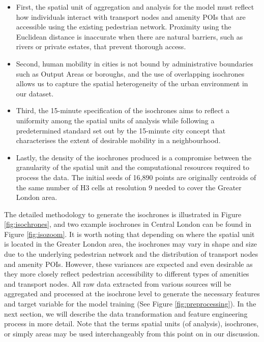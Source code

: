 \begin{itemize}
    \setlength\itemsep{0em}
    \item First, the spatial unit of aggregation and analysis for the model must reflect how individuals interact with transport nodes and amenity POIs that are accessible using the existing pedestrian network. Proximity using the Euclidean distance is inaccurate when there are natural barriers, such as rivers or private estates, that prevent thorough access. 
    \item Second, human mobility in cities is not bound by administrative boundaries such as Output Areas or boroughs, and the use of overlapping isochrones allows us to capture the spatial heterogeneity of the urban environment in our dataset.
    \item Third, the 15-minute specification of the isochrones aims to reflect a uniformity among the spatial units of analysis while following a predetermined standard set out by the 15-minute city concept that characterises the extent of desirable mobility in a neighbourhood.
    \item Lastly, the density of the isochrones produced is a compromise between the granularity of the spatial unit and the computational resources required to process the data. The initial seeds of 16,890 points are originally centroids of the same number of H3 cells at resolution 9 needed to cover the Greater London area. 
\end{itemize}

The detailed methodology to generate the isochrones is illustrated in Figure \ref{fig:isochrones}, and two example isochrones in Central London can be found in Figure \ref{fig:isozoom}. It is worth noting that depending on where the spatial unit is located in the Greater London area, the isochrones may vary in shape and size due to the underlying pedestrian network and the distribution of transport nodes and amenity POIs. However, these variances are expected and even desirable as they more closely reflect pedestrian accessibility to different types of amenities and transport nodes. All raw data extracted from various sources will be aggregated and processed at the isochrone level to generate the necessary features and target variable for the model training (See Figure \ref{fig:preprocessing}). In the next section, we will describe the data transformation and feature engineering process in more detail. Note that the terms spatial units (of analysis), isochrones, or simply areas may be used interchangeably from this point on in our discussion.

